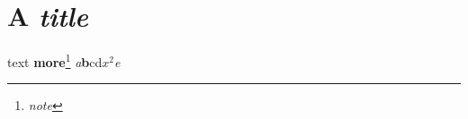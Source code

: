 \documentclass{article}
\begin{document}
\section{A \textit{title}} text \textbf{more}\footnote{\emph{note}}
{\itshape a}{\bfseries b}{\sffamily c}{\small d}{\footnotesize $x^2$}{\large\slshape e}
\end{document}
